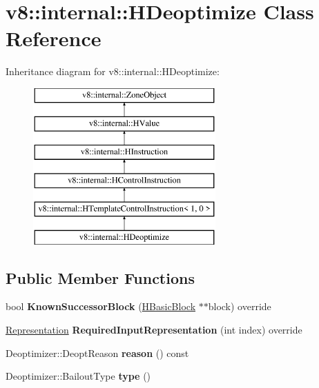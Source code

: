 \hypertarget{classv8_1_1internal_1_1_h_deoptimize}{}\section{v8\+:\+:internal\+:\+:H\+Deoptimize Class Reference}
\label{classv8_1_1internal_1_1_h_deoptimize}
Inheritance diagram for v8\+:\+:internal\+:\+:H\+Deoptimize\+:\begin{figure}[H]
\begin{center}
\leavevmode
\includegraphics[height=6.000000cm]{classv8_1_1internal_1_1_h_deoptimize}
\end{center}
\end{figure}
\subsection*{Public Member Functions}
\begin{DoxyCompactItemize}
\item 
bool {\bfseries Known\+Successor\+Block} (\hyperlink{classv8_1_1internal_1_1_h_basic_block}{H\+Basic\+Block} $\ast$$\ast$block) override\hypertarget{classv8_1_1internal_1_1_h_deoptimize_a103c902a88782477223842e47ff2eaa9}{}\label{classv8_1_1internal_1_1_h_deoptimize_a103c902a88782477223842e47ff2eaa9}

\item 
\hyperlink{classv8_1_1internal_1_1_representation}{Representation} {\bfseries Required\+Input\+Representation} (int index) override\hypertarget{classv8_1_1internal_1_1_h_deoptimize_af273cb2d891f9359091e331d42ed3437}{}\label{classv8_1_1internal_1_1_h_deoptimize_af273cb2d891f9359091e331d42ed3437}

\item 
Deoptimizer\+::\+Deopt\+Reason {\bfseries reason} () const \hypertarget{classv8_1_1internal_1_1_h_deoptimize_a714480a27ec22ff6d6dd5fc6d65a7718}{}\label{classv8_1_1internal_1_1_h_deoptimize_a714480a27ec22ff6d6dd5fc6d65a7718}

\item 
Deoptimizer\+::\+Bailout\+Type {\bfseries type} ()\hypertarget{classv8_1_1internal_1_1_h_deoptimize_acff5b8cfebb6edc9826a79c64f62c058}{}\label{classv8_1_1internal_1_1_h_deoptimize_acff5b8cfebb6edc9826a79c64f62c058}

\end{DoxyCompactItemize}
